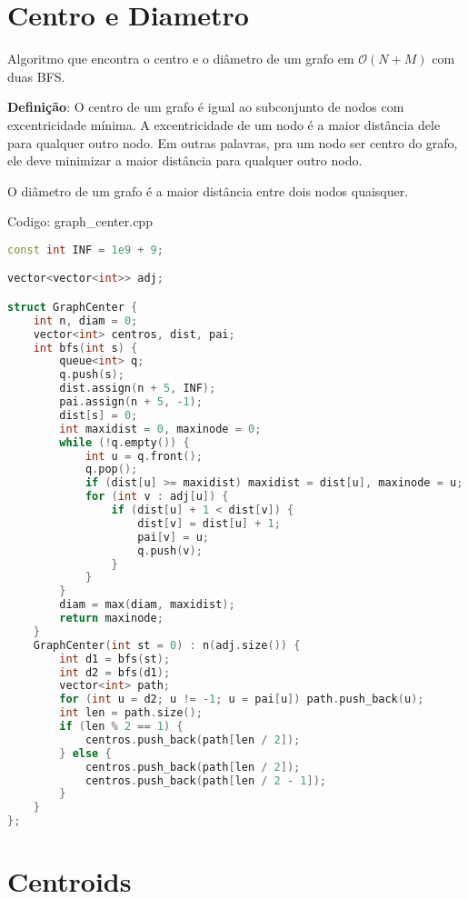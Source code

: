 \documentclass[10pt, a4paper, oneside]{book}
\begin{document}
\section{Centro e Diametro}


Algoritmo que encontra o centro e o diâmetro de um grafo em $\mathcal{O}(N + M)$ com duas BFS.



\textbf{Definição}: O centro de um grafo é igual ao subconjunto de nodos com excentricidade mínima. A excentricidade de um nodo é a maior distância dele para qualquer outro nodo. Em outras palavras, pra um nodo ser centro do grafo, ele deve minimizar a maior distância para qualquer outro nodo.



O diâmetro de um grafo é a maior distância entre dois nodos quaisquer.
\hfill

Codigo: graph\_center.cpp

\begin{lstlisting}[language=C++]
const int INF = 1e9 + 9;

vector<vector<int>> adj;

struct GraphCenter {
    int n, diam = 0;
    vector<int> centros, dist, pai;
    int bfs(int s) {
        queue<int> q;
        q.push(s);
        dist.assign(n + 5, INF);
        pai.assign(n + 5, -1);
        dist[s] = 0;
        int maxidist = 0, maxinode = 0;
        while (!q.empty()) {
            int u = q.front();
            q.pop();
            if (dist[u] >= maxidist) maxidist = dist[u], maxinode = u;
            for (int v : adj[u]) {
                if (dist[u] + 1 < dist[v]) {
                    dist[v] = dist[u] + 1;
                    pai[v] = u;
                    q.push(v);
                }
            }
        }
        diam = max(diam, maxidist);
        return maxinode;
    }
    GraphCenter(int st = 0) : n(adj.size()) {
        int d1 = bfs(st);
        int d2 = bfs(d1);
        vector<int> path;
        for (int u = d2; u != -1; u = pai[u]) path.push_back(u);
        int len = path.size();
        if (len % 2 == 1) {
            centros.push_back(path[len / 2]);
        } else {
            centros.push_back(path[len / 2]);
            centros.push_back(path[len / 2 - 1]);
        }
    }
};
\end{lstlisting}
\hfill

\section{Centroids}
\end{document}
